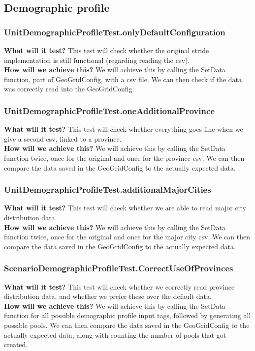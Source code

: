 \documentclass{article}
\begin{document}
\subsection{Demographic profile}
\subsubsection{UnitDemographicProfileTest.onlyDefaultConfiguration} 
\textbf{What will it test?} 
This test will check whether the original stride implementation is still functional (regarding reading the csv). \\
\newline
\textbf{How will we achieve this?} 
We will achieve this by calling the SetData function, part of GeoGridConfig, with a csv file. We can then check if the data was correctly read into the GeoGridConfig.

\subsubsection{UnitDemographicProfileTest.oneAdditionalProvince}
\textbf{What will it test?} 
This test will check whether everything goes fine when we give a second csv, linked to a province. \\
\newline
\textbf{How will we achieve this?}
We will achieve this by calling the SetData function twice, once for the original and once for the province csv. We can then compare the data saved in the GeoGridConfig to the actually expected data.

\subsubsection{UnitDemographicProfileTest.additionalMajorCities}
\textbf{What will it test?} 
This test will check whether we are able to read major city distribution data. \\
\newline
\textbf{How will we achieve this?}
We will achieve this by calling the SetData function twice, once for the original and once for the major city csv. We can then compare the data saved in the GeoGridConfig to the actually expected data.

\subsubsection{ScenarioDemographicProfileTest.CorrectUseOfProvinces}
\textbf{What will it test?} 
This test will check whether we correctly read province distribution data, and whether we prefer these over the default data. \\
\newline
\textbf{How will we achieve this?}
We will achieve this by calling the SetData function for all possible demographic profile input tags, followed by generating all possible pools. We can then compare the data saved in the GeoGridConfig to the actually expected data, along with counting the number of pools that got created.
\end{document}
